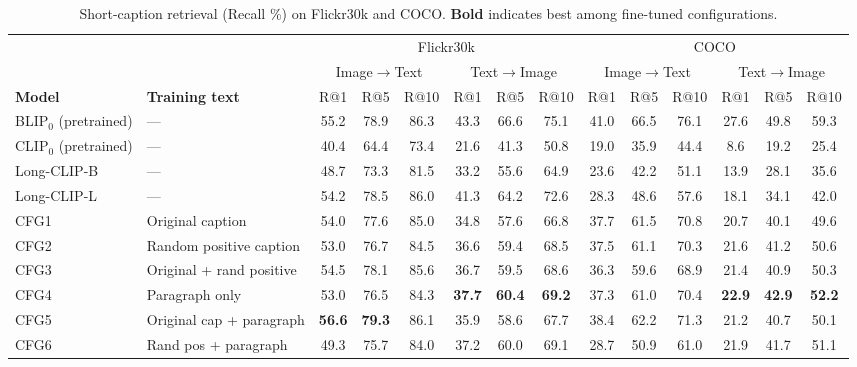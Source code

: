 \documentclass{article}
\begin{document}
\pagestyle{empty}

\begin{table}[t]
\centering
\caption{Short-caption retrieval (Recall \%) on Flickr30k and COCO. \textbf{Bold} indicates best among fine-tuned configurations.}
\label{tab:short_caption}
\small
\setlength{\tabcolsep}{3.5pt}
\begin{adjustbox}{max width=\textwidth}
\begin{tabular}{llcccccccccccc}
\toprule
 &  & \multicolumn{6}{c}{Flickr30k} & \multicolumn{6}{c}{COCO} \\
\cmidrule(lr){3-8}
\cmidrule(lr){9-14}
 &  & \multicolumn{3}{c}{Image$\to$Text} & \multicolumn{3}{c}{Text$\to$Image} & \multicolumn{3}{c}{Image$\to$Text} & \multicolumn{3}{c}{Text$\to$Image} \\
\cmidrule(lr){3-5}
\cmidrule(lr){6-8}
\cmidrule(lr){9-11}
\cmidrule(lr){12-14}
\textbf{Model} & \textbf{Training text} & R@1 & R@5 & R@10 & R@1 & R@5 & R@10 & R@1 & R@5 & R@10 & R@1 & R@5 & R@10 \\
\midrule
BLIP$_0$ (pretrained) & --- & 55.2 & 78.9 & 86.3 & 43.3 & 66.6 & 75.1 & 41.0 & 66.5 & 76.1 & 27.6 & 49.8 & 59.3 \\
CLIP$_0$ (pretrained) & --- & 40.4 & 64.4 & 73.4 & 21.6 & 41.3 & 50.8 & 19.0 & 35.9 & 44.4 & 8.6 & 19.2 & 25.4 \\
Long-CLIP-B & --- & 48.7 & 73.3 & 81.5 & 33.2 & 55.6 & 64.9 & 23.6 & 42.2 & 51.1 & 13.9 & 28.1 & 35.6 \\
Long-CLIP-L & --- & 54.2 & 78.5 & 86.0 & 41.3 & 64.2 & 72.6 & 28.3 & 48.6 & 57.6 & 18.1 & 34.1 & 42.0 \\
\midrule
CFG1 & Original caption & 54.0 & 77.6 & 85.0 & 34.8 & 57.6 & 66.8 & 37.7 & 61.5 & 70.8 & 20.7 & 40.1 & 49.6 \\
CFG2 & Random positive caption & 53.0 & 76.7 & 84.5 & 36.6 & 59.4 & 68.5 & 37.5 & 61.1 & 70.3 & 21.6 & 41.2 & 50.6 \\
CFG3 & Original + rand positive & 54.5 & 78.1 & 85.6 & 36.7 & 59.5 & 68.6 & 36.3 & 59.6 & 68.9 & 21.4 & 40.9 & 50.3 \\
CFG4 & Paragraph only & 53.0 & 76.5 & 84.3 & \textbf{37.7} & \textbf{60.4} & \textbf{69.2} & 37.3 & 61.0 & 70.4 & \textbf{22.9} & \textbf{42.9} & \textbf{52.2} \\
CFG5 & Original cap + paragraph & \textbf{56.6} & \textbf{79.3} & 86.1 & 35.9 & 58.6 & 67.7 & 38.4 & 62.2 & 71.3 & 21.2 & 40.7 & 50.1 \\
CFG6 & Rand pos + paragraph & 49.3 & 75.7 & 84.0 & 37.2 & 60.0 & 69.1 & 28.7 & 50.9 & 61.0 & 21.9 & 41.7 & 51.1 \\

\end{tabular}
\end{adjustbox}
\end{table}
\end{document}
